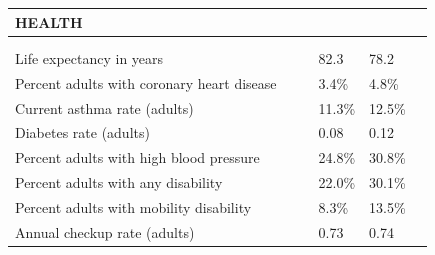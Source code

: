 \documentclass[9pt]{report}
\begin{document}
\newpage
\setlength{\tabcolsep}{.01in} %
\begin{tabular}{p{.10in}p{.10in}p{.10in}p{3.7in}>{\hfill}p{.85in}>{\hfill}p{.85in}>{\hfill}p{.85in}>{\hfill}p{.85in}p{0.1in}}
\multicolumn{9}{l}{\parbox{7.1in}{\raggedright{\large{\strut\textbf{HEALTH}\strut}}}} \\ 
\hline
\multicolumn{4}{l}{\parbox{3.5in}{\raggedright{\textbf{}}}} & \multicolumn{1}{r}{\parbox{.85in}{\strut\raggedleft{\textbf{}\strut}}} & \multicolumn{1}{r}{\parbox{.85in}{\strut\raggedleft{\textbf{}\strut}}} & \multicolumn{1}{r}{\parbox{.85in}{\strut{}}} & \multicolumn{1}{r}{\parbox{.85in}{\strut{}}} & \\ 
\multicolumn{9}{l}{} \\ 
\multicolumn{4}{l}{\parbox{3.6in}{\strut\raggedright{{Life expectancy in years}}\strut}} &  &  & 82.3 & 78.2 & \multicolumn{1}{l}{}  \\ 
\multicolumn{4}{l}{\parbox{3.6in}{\strut\raggedright{{Percent adults with coronary heart disease}}\strut}} &  &  & 3.4\% & 4.8\% & \multicolumn{1}{l}{}  \\ 
\multicolumn{4}{l}{\parbox{3.6in}{\strut\raggedright{{Current asthma rate (adults)}}\strut}} &  &  & 11.3\% & 12.5\% & \multicolumn{1}{l}{}  \\ 
\multicolumn{4}{l}{\parbox{3.6in}{\strut\raggedright{{Diabetes rate (adults)}}\strut}} &  &  & 0.08 & 0.12 & \multicolumn{1}{l}{}  \\ 
\multicolumn{4}{l}{\parbox{3.6in}{\strut\raggedright{{Percent adults with high blood pressure}}\strut}} &  &  & 24.8\% & 30.8\% & \multicolumn{1}{l}{}  \\ 
\multicolumn{4}{l}{\parbox{3.6in}{\strut\raggedright{{Percent adults with any disability}}\strut}} &  &  & 22.0\% & 30.1\% & \multicolumn{1}{l}{}  \\ 
\multicolumn{4}{l}{\parbox{3.6in}{\strut\raggedright{{Percent adults with mobility disability}}\strut}} &  &  & 8.3\% & 13.5\% & \multicolumn{1}{l}{}  \\ 
\multicolumn{4}{l}{\parbox{3.6in}{\strut\raggedright{{Annual checkup rate (adults)}}\strut}} &  &  & 0.73 & 0.74 & \multicolumn{1}{l}{}  \\ 

\end{tabular}
\end{document}
